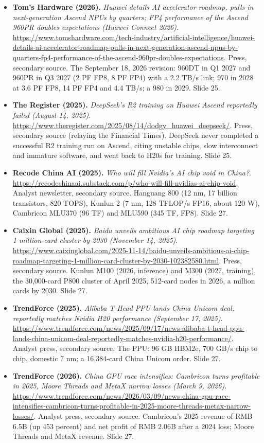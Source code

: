 \documentclass[11pt,letterpaper]{article}
\begin{document}
\begin{itemize}[leftmargin=1.2em,itemsep=3pt]
\item \textbf{Tom's Hardware (2026).} \textit{Huawei details AI accelerator roadmap, pulls in next-generation Ascend NPUs by quarters; FP4 performance of the Ascend 960PR doubles expectations (Huawei Connect 2026)}. \url{https://www.tomshardware.com/tech-industry/artificial-intelligence/huawei-details-ai-accelerator-roadmap-pulls-in-next-generation-ascend-npus-by-quarters-fp4-performance-of-the-ascend-960pr-doubles-expectations}. Press, secondary source. The September 18, 2026 revision: 960DT in Q1 2027 and 960PR in Q3 2027 (2 PF FP8, 8 PF FP4) with a 2.2 TB/s link; 970 in 2028 at 3.6 PF FP8, 14 PF FP4 and 4.4 TB/s; a 980 in 2029. Slide 25.
\item \textbf{The Register (2025).} \textit{DeepSeek's R2 training on Huawei Ascend reportedly failed (August 14, 2025)}. \url{https://www.theregister.com/2025/08/14/dodgy_huawei_deepseek/}. Press, secondary source (relaying the Financial Times). DeepSeek never completed a successful R2 training run on Ascend, citing unstable chips, slow interconnect and immature software, and went back to H20s for training. Slide 25.
\item \textbf{Recode China AI (2025).} \textit{Who will fill Nvidia's AI chip void in China?}. \url{https://recodechinaai.substack.com/p/who-will-fill-nvidias-ai-chip-void}. Analyst newsletter, secondary source. Hanguang 800 (12 nm, 17 billion transistors, 820 TOPS), Kunlun 2 (7 nm, 128 TFLOP/s FP16, about 120 W), Cambricon MLU370 (96 TF) and MLU590 (345 TF, FP8). Slide 27.
\item \textbf{Caixin Global (2025).} \textit{Baidu unveils ambitious AI chip roadmap targeting 1 million-card cluster by 2030 (November 14, 2025)}. \url{https://www.caixinglobal.com/2025-11-14/baidu-unveils-ambitious-ai-chip-roadmap-targeting-1-million-card-cluster-by-2030-102382580.html}. Press, secondary source. Kunlun M100 (2026, inference) and M300 (2027, training), the 30,000-card P800 cluster of April 2025, 512-card nodes in 2026, a million cards by 2030. Slide 27.
\item \textbf{TrendForce (2025).} \textit{Alibaba T-Head PPU lands China Unicom deal, reportedly matches Nvidia H20 performance (September 17, 2025)}. \url{https://www.trendforce.com/news/2025/09/17/news-alibaba-t-head-ppu-lands-china-unicom-deal-reportedly-matches-nvidia-h20-performance/}. Analyst press, secondary source. The PPU: 96 GB HBM2e, 700 GB/s chip to chip, domestic 7 nm; a 16,384-card China Unicom order. Slide 27.
\item \textbf{TrendForce (2026).} \textit{China GPU race intensifies: Cambricon turns profitable in 2025, Moore Threads and MetaX narrow losses (March 9, 2026)}. \url{https://www.trendforce.com/news/2026/03/09/news-china-gpu-race-intensifies-cambricon-turns-profitable-in-2025-moore-threads-metax-narrow-losses/}. Analyst press, secondary source. Cambricon's 2025 revenue of RMB 6.5B (up 453 percent) and net profit of RMB 2.06B after a 2024 loss; Moore Threads and MetaX revenue. Slide 27.

\end{itemize}
\end{document}
